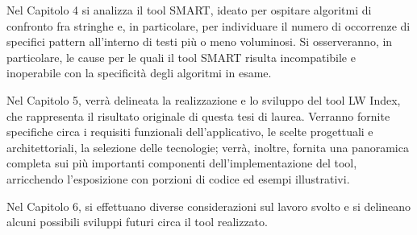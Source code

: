 Nel Capitolo 4 si analizza il tool SMART, ideato per ospitare algoritmi di confronto fra stringhe e, in particolare, per individuare il numero di occorrenze di specifici pattern all'interno di testi più o meno voluminosi. Si osserveranno, in particolare, le cause per le quali il tool SMART risulta incompatibile e inoperabile con la specificità degli algoritmi in esame.

Nel Capitolo 5, verrà delineata la realizzazione e lo sviluppo del tool LW Index, che rappresenta il risultato originale di questa tesi di laurea. Verranno fornite specifiche circa i requisiti funzionali dell'applicativo, le scelte progettuali e architettoriali, la selezione delle tecnologie; verrà, inoltre, fornita una panoramica completa sui più importanti componenti dell'implementazione del tool, arricchendo l'esposizione con porzioni di codice ed esempi illustrativi.

Nel Capitolo 6, si effettuano diverse considerazioni sul lavoro svolto e si delineano alcuni possibili sviluppi futuri circa il tool realizzato.